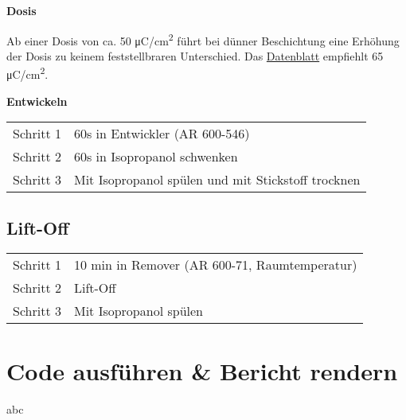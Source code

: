 \documentclass[
  paper=a4,
  ,captions=tableheading
]{scrartcl}
\begin{document}
\textbf{Dosis}

Ab einer Dosis von ca. 50 μC/cm\textsuperscript{2} führt bei dünner Beschichtung eine Erhöhung der Dosis zu keinem feststellbraren Unterschied. Das \href{https://www.allresist.de/wp-content/uploads/2020/03/AR-P6200_CSAR62_Deutsch_Allresist_Produktinformation.pdf}{Datenblatt} empfiehlt 65 μC/cm\textsuperscript{2}.

\textbf{Entwickeln}

\begin{longtable}[]{@{}ll@{}}
\toprule
\endhead
Schritt 1 & 60s in Entwickler (AR 600-546)\tabularnewline
Schritt 2 & 60s in Isopropanol schwenken\tabularnewline
Schritt 3 & Mit Isopropanol spülen und mit Stickstoff trocknen\tabularnewline
\bottomrule
\end{longtable}

\hypertarget{lift-off}{%
\subsection*{Lift-Off}\label{lift-off}}

\begin{longtable}[]{@{}ll@{}}
\toprule
\endhead
Schritt 1 & 10 min in Remover (AR 600-71, Raumtemperatur)\tabularnewline
Schritt 2 & Lift-Off\tabularnewline
Schritt 3 & Mit Isopropanol spülen\tabularnewline
\bottomrule
\end{longtable}

\hypertarget{code-ausfuxfchren-bericht-rendern}{%
\section{Code ausführen \& Bericht rendern}\label{code-ausfuxfchren-bericht-rendern}}

abc

  
\end{document}
